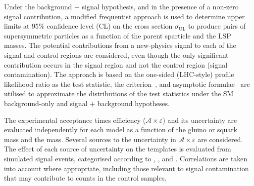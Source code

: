 Under the background + signal hypothesis, and in the presence of a
non-zero signal contribution, a modified frequentist approach is used
to determine upper limits at 95\% confidence level (CL) on the cross
section $\sigma_\text{UL}$ to produce pairs of supersymmetric
particles as a function of the parent sparticle and the LSP
masses. The potential contributions from a new-physics signal to each
of the signal and control regions are considered, even though the only
significant contribution occurs in the signal region and not the
control region (\ie signal contamination). The approach is based on
the one-sided (LHC-style) profile likelihood ratio as the test
statistic, the \cls criterion~\cite{junk, read}, and asymptotic
formulae~\cite{Cowan:2010js} are utilised to approximate the
distributions of the test statistics under the SM background-only and
signal + background hypotheses.

The experimental acceptance times efficiency
($\mathcal{A}\times\varepsilon$) and its uncertainty are evaluated
independently for each model as a function of the gluino or squark
mass and the \chiz mass. Several sources to the uncertainty in
$\mathcal{A}\times\varepsilon$ are considered. The effect of each
source of uncertainty on the \mht templates is evaluated from
simulated signal events, categorised according to \njet, \nb, and
\scalht. Correlations are taken into account where appropriate,
including those relevant to signal contamination that may contribute
to counts in the control samples.

